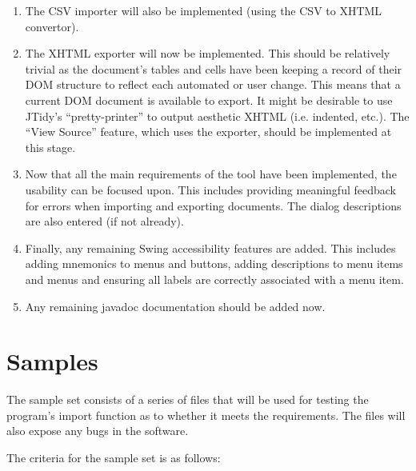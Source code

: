\begin{enumerate}
\item The CSV importer will also be implemented (using the CSV to XHTML convertor).

\item The XHTML exporter will now be implemented. This should be relatively
trivial as the document's tables and cells have been keeping a record of their
DOM structure to reflect each automated or user change. This means that a
current DOM document is available to export. It might be desirable to use
JTidy's ``pretty-printer'' to output aesthetic XHTML (i.e. indented, etc.).
The ``View Source'' feature, which uses the exporter, should be implemented at
this stage.

\item Now that all the main requirements of the tool have been implemented, the
usability can be focused upon. This includes providing meaningful feedback for
errors when importing and exporting documents. The dialog descriptions are also
entered (if not already).

\item Finally, any remaining Swing accessibility features are added. This includes adding
mnemonics to menus and buttons, adding descriptions to menu items and menus and ensuring
all labels are correctly associated with a menu item.

\item Any remaining javadoc documentation should be added now.

\end{enumerate}

\section{Samples}

The sample set consists of a series of files that will be used for testing
the program's import function as to whether it meets the requirements. The
files will also expose any bugs in the software. 

The criteria for the sample set is as follows:

